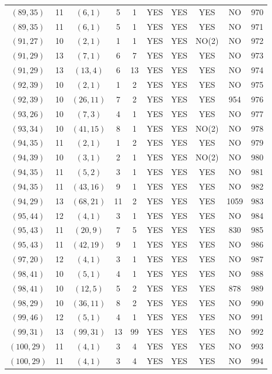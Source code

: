 \begin{longtable}{|c|c|c|c|c|c|c|c|c|c|}
$(89, 35)$ & 11 & $(6, 1)$ & 5 & 1 & YES & YES & YES & NO & 970\\
$(89, 35)$ & 11 & $(6, 1)$ & 5 & 1 & YES & YES & YES & NO & 971\\
$(91, 27)$ & 10 & $(2, 1)$ & 1 & 1 & YES & YES & NO(2) & NO & 972\\
$(91, 29)$ & 13 & $(7, 1)$ & 6 & 7 & YES & YES & YES & NO & 973\\
$(91, 29)$ & 13 & $(13, 4)$ & 6 & 13 & YES & YES & YES & NO & 974\\
$(92, 39)$ & 10 & $(2, 1)$ & 1 & 2 & YES & YES & YES & NO & 975\\
$(92, 39)$ & 10 & $(26, 11)$ & 7 & 2 & YES & YES & YES & 954 & 976\\
$(93, 26)$ & 10 & $(7, 3)$ & 4 & 1 & YES & YES & YES & NO & 977\\
$(93, 34)$ & 10 & $(41, 15)$ & 8 & 1 & YES & YES & NO(2) & NO & 978\\
$(94, 35)$ & 11 & $(2, 1)$ & 1 & 2 & YES & YES & YES & NO & 979\\
$(94, 39)$ & 10 & $(3, 1)$ & 2 & 1 & YES & YES & NO(2) & NO & 980\\
$(94, 35)$ & 11 & $(5, 2)$ & 3 & 1 & YES & YES & YES & NO & 981\\
$(94, 35)$ & 11 & $(43, 16)$ & 9 & 1 & YES & YES & YES & NO & 982\\
$(94, 29)$ & 13 & $(68, 21)$ & 11 & 2 & YES & YES & YES & 1059 & 983\\
$(95, 44)$ & 12 & $(4, 1)$ & 3 & 1 & YES & YES & YES & NO & 984\\
$(95, 43)$ & 11 & $(20, 9)$ & 7 & 5 & YES & YES & YES & 830 & 985\\
$(95, 43)$ & 11 & $(42, 19)$ & 9 & 1 & YES & YES & YES & NO & 986\\
$(97, 20)$ & 12 & $(4, 1)$ & 3 & 1 & YES & YES & YES & NO & 987\\
$(98, 41)$ & 10 & $(5, 1)$ & 4 & 1 & YES & YES & YES & NO & 988\\
$(98, 41)$ & 10 & $(12, 5)$ & 5 & 2 & YES & YES & YES & 878 & 989\\
$(98, 29)$ & 10 & $(36, 11)$ & 8 & 2 & YES & YES & YES & NO & 990\\
$(99, 46)$ & 12 & $(5, 1)$ & 4 & 1 & YES & YES & YES & NO & 991\\
$(99, 31)$ & 13 & $(99, 31)$ & 13 & 99 & YES & YES & YES & NO & 992\\
$(100, 29)$ & 11 & $(4, 1)$ & 3 & 4 & YES & YES & YES & NO & 993\\
$(100, 29)$ & 11 & $(4, 1)$ & 3 & 4 & YES & YES & YES & NO & 994\\

\end{longtable}

